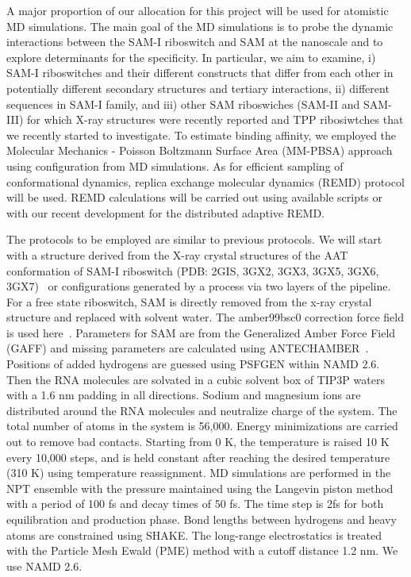 \documentclass[a4paper,11pt]{article}
\begin{document}
A major proportion of our allocation for this project will be used for atomistic MD simulations.  The main goal of the MD simulations is to probe the dynamic interactions between the SAM-I riboswitch and SAM at the nanoscale and to explore determinants for the specificity. In particular, we aim to examine, i) SAM-I riboswitches and their different constructs that differ from each other in potentially different secondary structures and tertiary interactions, ii) different sequences in SAM-I family, and iii) other SAM riboswiches (SAM-II and SAM-III) for which X-ray structures were recently reported and TPP ribosiwtches that we recently started to investigate.  To estimate binding affinity, we employed the Molecular Mechanics - Poisson Boltzmann Surface Area (MM-PBSA) approach using configuration from MD simulations.  As for efficient sampling of conformational dynamics, replica exchange molecular dynamics (REMD) protocol will be used.  REMD calculations will be carried out using available scripts or with our recent development for the distributed adaptive REMD.  

The protocols to be employed are similar to previous protocols.  We will start with a structure derived from the X-ray crystal structures of the AAT conformation of SAM-I riboswitch (PDB: 2GIS, 3GX2, 3GX3, 3GX5, 3GX6, 3GX7)~\cite{montange} or configurations generated by a process via two layers of the pipeline. For a free state riboswitch, SAM is directly removed from the x-ray crystal structure and replaced with solvent water. The amber99bsc0 correction force field is used here~\cite{alberto}. Parameters for SAM are from the Generalized Amber Force Field (GAFF) and missing parameters are calculated using ANTECHAMBER~\cite{wang}. Positions of added hydrogens are guessed using PSFGEN within NAMD 2.6. Then the RNA molecules are solvated in a cubic solvent box of TIP3P waters with a 1.6 nm padding in all directions. Sodium and magnesium ions are distributed around the RNA molecules and neutralize charge of the system. The total number of atoms in the system is 56,000. Energy minimizations are carried out to remove bad contacts. Starting from 0 K, the temperature is raised 10 K every 10,000 steps, and is held constant after reaching the desired temperature (310 K) using temperature reassignment. MD simulations are performed in the NPT ensemble with the pressure maintained using the Langevin piston method with a period of 100 fs and decay times of 50 fs. The time step is 2fs for both equilibration and production phase. Bond lengths between hydrogens and heavy atoms are constrained using SHAKE. The long-range electrostatics is treated with the Particle Mesh Ewald (PME) method with a cutoff distance 1.2 nm.  We use NAMD 2.6.
\end{document}
